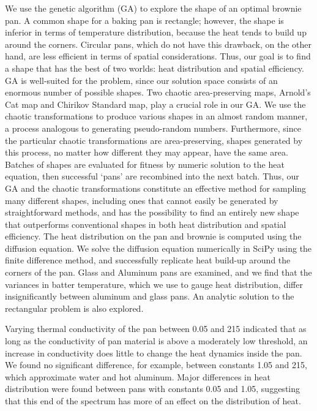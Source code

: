 \documentclass[12pt,draft]{reedmcm}
\begin{document}
\begin{summary}
  We use the genetic algorithm (GA) to explore the shape of an optimal brownie pan.
  A common shape for a baking pan is rectangle; however, the shape is inferior in terms of temperature distribution, because the heat tends to build up around the corners.
  Circular pans, which do not have this drawback, on the other hand, are less efficient in terms of spatial considerations.
  Thus, our goal is to find a shape that has the best of two worlds: heat distribution and spatial efficiency.
  GA is well-suited for the problem, since our solution space consists of an enormous number of possible shapes.
  Two chaotic area-preserving maps, Arnold's Cat map and Chirikov Standard map, play a crucial role in our GA.
  We use the chaotic transformations to produce various shapes in an almost random manner, a process analogous to generating pseudo-random numbers.
  Furthermore, since the particular chaotic transformations are area-preserving, shapes generated by this process, no matter how different they may appear, have the same area.  Batches of shapes are evaluated for fitness by numeric solution to the heat equation, then successful `pans' are recombined into the next batch.
  Thus, our GA and the chaotic transformations constitute an effective method for sampling many different shapes, including ones that cannot easily be generated by straightforward methods, and  has the possibility to find an entirely new shape that outperforms conventional shapes in both heat distribution and spatial efficiency.
  The heat distribution on the pan and brownie is computed using the diffusion equation.
  We solve the diffusion equation numerically in SciPy using the finite difference method, and successfully replicate heat build-up around the corners of the pan.  Glass and Aluminum pans are examined, and we find that the variances in batter temperature, which we use to gauge heat distribution, differ insignificantly between aluminum and glass pans.  An analytic solution to the rectangular problem is also explored.

  Varying thermal conductivity of the pan between 0.05 and 215 indicated that as long as the conductivity of pan material is above a moderately low threshold,  an increase in conductivity does little to change the heat dynamics inside the pan.  We found no significant difference, for example, between constants 1.05 and 215, which approximate water and hot aluminum.  Major differences in heat distribution were found between pans with constants 0.05 and 1.05, suggesting that this end of the spectrum has more of an effect on the distribution of heat.
\end{summary}
\end{document}
